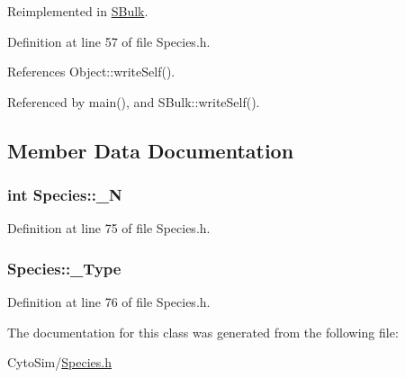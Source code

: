 Reimplemented in \hyperlink{classSBulk_af96d228dfe5348a5a7944b69c3ddf8fa}{S\-Bulk}.



Definition at line 57 of file Species.\-h.



References Object\-::write\-Self().



Referenced by main(), and S\-Bulk\-::write\-Self().



\subsection{Member Data Documentation}
\hypertarget{classSpecies_aaf64f0a20dc213a6f03c69e7c3caa43a}{
\subsubsection[{\-\_\-\-N}]{\setlength{\rightskip}{0pt plus 5cm}int {\bf Species\-::\-\_\-\-N}}}\label{classSpecies_aaf64f0a20dc213a6f03c69e7c3caa43a}


Definition at line 75 of file Species.\-h.

\hypertarget{classSpecies_ae80ccbaa2b115cea250b7f87ce517105}{
\subsubsection[{\-\_\-\-Type}]{ {\bf Species\-::\-\_\-\-Type}}}\label{classSpecies_ae80ccbaa2b115cea250b7f87ce517105}


Definition at line 76 of file Species.\-h.



The documentation for this class was generated from the following file\-:\begin{DoxyCompactItemize}
\item 
Cyto\-Sim/\hyperlink{Species_8h}{Species.\-h}\end{DoxyCompactItemize}
